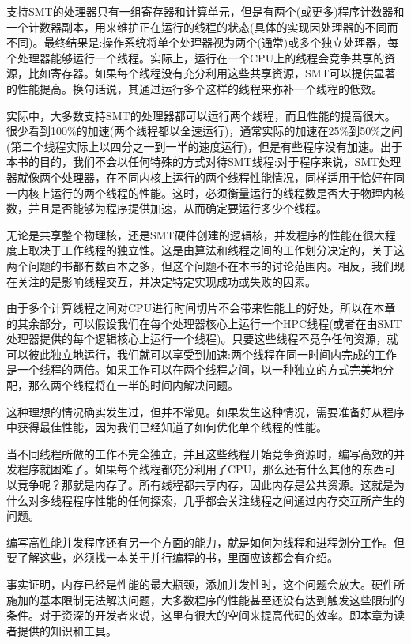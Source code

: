 支持SMT的处理器只有一组寄存器和计算单元，但是有两个(或更多)程序计数器和一个计数器副本，用来维护正在运行的线程的状态(具体的实现因处理器的不同而不同)。最终结果是:操作系统将单个处理器视为两个(通常)或多个独立处理器，每个处理器能够运行一个线程。实际上，运行在一个CPU上的线程会竞争共享的资源，比如寄存器。如果每个线程没有充分利用这些共享资源，SMT可以提供显著的性能提高。换句话说，其通过运行多个这样的线程来弥补一个线程的低效。

实际中，大多数支持SMT的处理器都可以运行两个线程，而且性能的提高很大。很少看到100\%的加速(两个线程都以全速运行)，通常实际的加速在25\%到50\%之间(第二个线程实际上以四分之一到一半的速度运行)，但是有些程序没有加速。出于本书的目的，我们不会以任何特殊的方式对待SMT线程:对于程序来说，SMT处理器就像两个处理器，在不同内核上运行的两个线程性能情况，同样适用于恰好在同一内核上运行的两个线程的性能。这时，必须衡量运行的线程数是否大于物理内核数，并且是否能够为程序提供加速，从而确定要运行多少个线程。

无论是共享整个物理核，还是SMT硬件创建的逻辑核，并发程序的性能在很大程度上取决于工作线程的独立性。这是由算法和线程之间的工作划分决定的，关于这两个问题的书都有数百本之多，但这个问题不在本书的讨论范围内。相反，我们现在关注的是影响线程交互，并决定特定实现成功或失败的因素。


由于多个计算线程之间对CPU进行时间切片不会带来性能上的好处，所以在本章的其余部分，可以假设我们在每个处理器核心上运行一个HPC线程(或者在由SMT处理器提供的每个逻辑核心上运行一个线程)。只要这些线程不竞争任何资源，就可以彼此独立地运行，我们就可以享受到加速:两个线程在同一时间内完成的工作是一个线程的两倍。如果工作可以在两个线程之间，以一种独立的方式完美地分配，那么两个线程将在一半的时间内解决问题。

这种理想的情况确实发生过，但并不常见。如果发生这种情况，需要准备好从程序中获得最佳性能，因为我们已经知道了如何优化单个线程的性能。

当不同线程所做的工作不完全独立，并且这些线程开始竞争资源时，编写高效的并发程序就困难了。如果每个线程都充分利用了CPU，那么还有什么其他的东西可以竞争呢？那就是内存了。所有线程都共享内存，因此内存是公共资源。这就是为什么对多线程程序性能的任何探索，几乎都会关注线程之间通过内存交互所产生的问题。

编写高性能并发程序还有另一个方面的能力，就是如何为线程和进程划分工作。但要了解这些，必须找一本关于并行编程的书，里面应该都会有介绍。

事实证明，内存已经是性能的最大瓶颈，添加并发性时，这个问题会放大。硬件所施加的基本限制无法解决问题，大多数程序的性能甚至还没有达到触发这些限制的条件。对于资深的开发者来说，这里有很大的空间来提高代码的效率。即本章为读者提供的知识和工具。

